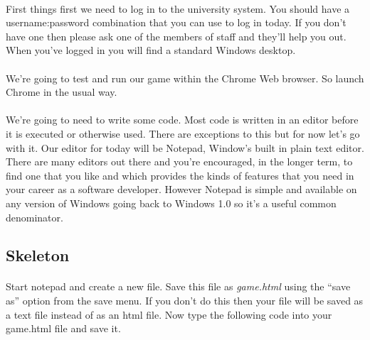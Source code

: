 \documentclass[10pt, a4paper, oneside]{article}
\begin{document}
\paragraph{} First things first we need to log in to the university system. You should have a username:password combination that you can use to log in today. If you don't have one then please ask one of the members of staff and they'll help you out. When you've logged in you will find a standard Windows desktop.

\paragraph{} We're going to test and run our game within the Chrome Web browser. So launch Chrome in the usual way.

\paragraph{} We're going to need to write some code. Most code is written in an editor before it is executed or otherwise used. There are exceptions to this but for now let's go with it. Our editor for today will be Notepad, Window's built in plain text editor. There are many editors out there and you're encouraged, in the longer term, to find one that you like and which provides the kinds of features that you need in your career as a software developer. However Notepad is simple and available on any version of Windows going back to Windows 1.0 so it's a useful common denominator.




\subsection{Skeleton}

\paragraph{} Start notepad and create a new file. Save this file as \emph{game.html} using the ``save as'' option from the save menu. If you don't do this then your file will be saved as a text file instead of as an html file. Now type the following code into your game.html file and save it.
\end{document}

